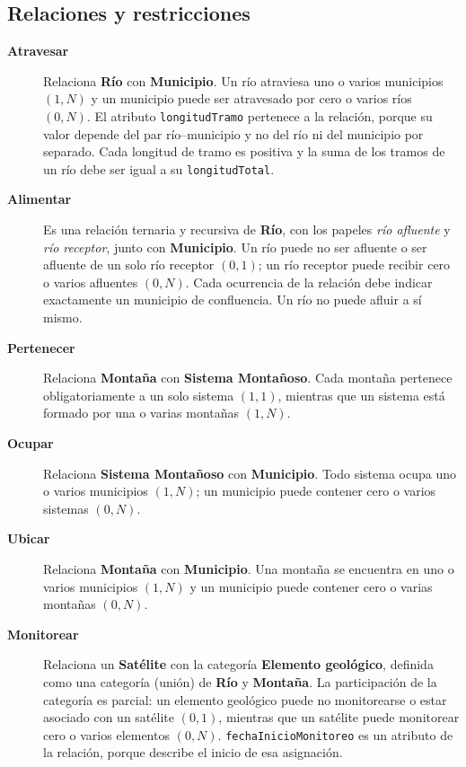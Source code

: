 \subsection{Relaciones y restricciones}

\begin{description}
  \item[\textbf{Atravesar}] Relaciona \textbf{Río} con \textbf{Municipio}.
        Un río atraviesa uno o varios municipios $(1,N)$ y un municipio puede
        ser atravesado por cero o varios ríos $(0,N)$. El atributo
        \texttt{longitudTramo} pertenece a la relación, porque su valor
        depende del par río--municipio y no del río ni del municipio por
        separado. Cada longitud de tramo es positiva y la suma de los tramos
        de un río debe ser igual a su \texttt{longitudTotal}.
  \item[\textbf{Alimentar}] Es una relación ternaria y recursiva de
        \textbf{Río}, con los papeles \emph{río afluente} y \emph{río
        receptor}, junto con \textbf{Municipio}. Un río puede no ser afluente
        o ser afluente de un solo río receptor $(0,1)$; un río receptor puede
        recibir cero o varios afluentes $(0,N)$. Cada ocurrencia de la relación
        debe indicar exactamente un municipio de confluencia. Un río no puede
        afluir a sí mismo.
  \item[\textbf{Pertenecer}] Relaciona \textbf{Montaña} con
        \textbf{Sistema Montañoso}. Cada montaña pertenece obligatoriamente a
        un solo sistema $(1,1)$, mientras que un sistema está formado por una
        o varias montañas $(1,N)$.
  \item[\textbf{Ocupar}] Relaciona \textbf{Sistema Montañoso} con
        \textbf{Municipio}. Todo sistema ocupa uno o varios municipios $(1,N)$;
        un municipio puede contener cero o varios sistemas $(0,N)$.
  \item[\textbf{Ubicar}] Relaciona \textbf{Montaña} con
        \textbf{Municipio}. Una montaña se encuentra en uno o varios
        municipios $(1,N)$ y un municipio puede contener cero o varias
        montañas $(0,N)$.
  \item[\textbf{Monitorear}] Relaciona un \textbf{Satélite} con la categoría
        \textbf{Elemento geológico}, definida como una categoría (unión) de
        \textbf{Río} y \textbf{Montaña}. La participación de la categoría es
        parcial: un elemento geológico puede no monitorearse o estar asociado
        con un satélite $(0,1)$, mientras que un satélite puede monitorear cero
        o varios elementos $(0,N)$. \texttt{fechaInicioMonitoreo} es un
        atributo de la relación, porque describe el inicio de esa asignación.
\end{description}

